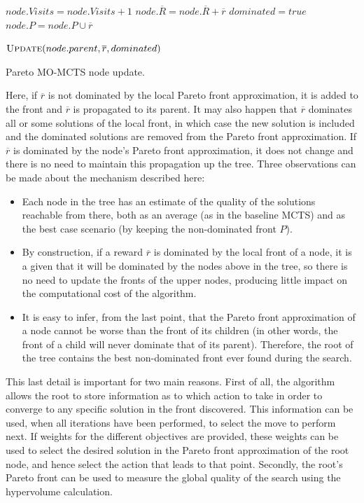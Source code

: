 \documentclass[journal]{IEEEtran}
\begin{document}
\begin{algorithm}[!t]
\begin{algorithmic}[1]

	\State $node.Visits = node.Visits + 1$
	\State $node.\overline{R} = node.\overline{R} + \overline{r}$
			\State $dominated = true$
		\Else
			\State $node.P = node.P \cup \overline{r}$
		\EndIf
	\EndIf

	\State $\Call{Update}{node.parent,\overline{r},dominated}$
	
\EndFunction
\end{algorithmic}
\caption{Pareto MO-MCTS node update.}
\label{alg:updPareto}
\end{algorithm}

Here, if $\overline{r}$ is not dominated by the local Pareto front approximation, it is added to the front and $\overline{r}$ is propagated to its parent. It may also happen that $\overline{r}$ dominates all or some solutions of the local front, in which case the new solution is included and the dominated solutions are removed from the Pareto front approximation. If $\overline{r}$ is dominated by the node's Pareto front approximation, it does not change and there is no need to maintain this propagation up the tree. Three observations can be made about the mechanism described here:

\begin{itemize}
\item Each node in the tree has an estimate of the quality of the solutions reachable from there, both as an average (as in the baseline MCTS) and as the best case scenario (by keeping the non-dominated front $P$).
\item By construction, if a reward $\overline{r}$ is dominated by the local front of a node, it is a given that it will be dominated by the nodes above in the tree, so there is no need to update the fronts of the upper nodes, producing little impact on the computational cost of the algorithm.
\item It is easy to infer, from the last point, that the Pareto front approximation of a node cannot be worse than the front of its children (in other words, the front of a child will never dominate that of its parent). Therefore, the root of the tree contains the best non-dominated front ever found during the search.
\end{itemize}

This last detail is important for two main reasons. First of all, the algorithm allows the root to store information as to which action to take in order to converge to any specific solution in the front discovered. This information can be used, when all iterations have been performed, to select the move to perform next. If weights for the different objectives are provided, these weights can be used to select the desired solution in the Pareto front approximation of the root node, and hence select the action that leads to that point. Secondly, the root's Pareto front can be used to measure the global quality of the search using the hypervolume calculation.
\end{document}
